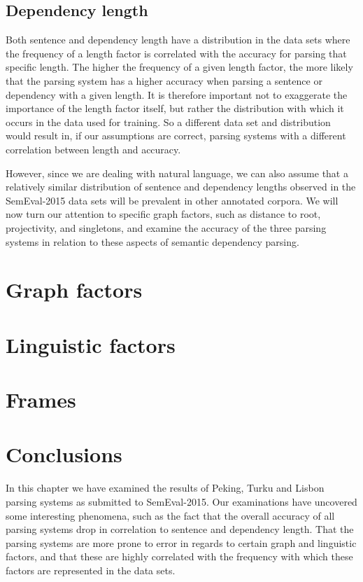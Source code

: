 \subsection{Dependency length}


Both sentence and dependency length have a distribution in the data sets where the frequency of a length factor is correlated with the accuracy for parsing that specific length. The higher the frequency of a given length factor, the more likely that the parsing system has a higher accuracy when parsing a sentence or dependency with a given length. It is therefore important not to exaggerate the importance of the length factor itself, but rather the distribution with which it occurs in the data used for training. So a different data set and distribution would result in, if our assumptions are correct, parsing systems with a different correlation between length and accuracy. 

However, since we are dealing with natural language, we can also assume that a relatively similar distribution of sentence and dependency lengths observed in the SemEval-2015 data sets will be prevalent in other annotated corpora. We will now turn our attention to specific graph factors, such as distance to root, projectivity, and singletons, and examine the accuracy of the three parsing systems in relation to these aspects of semantic dependency parsing.

\section{Graph factors}

\section{Linguistic factors}

\section{Frames}

\section{Conclusions}

In this chapter we have examined the results of Peking, Turku and Lisbon parsing systems as submitted to SemEval-2015. Our examinations have uncovered some interesting phenomena, such as the fact that the overall accuracy of all parsing systems drop in correlation to sentence and dependency length. That the parsing systems are more prone to error in regards to certain graph and linguistic factors, and that these are highly correlated with the frequency with which these factors are represented in the data sets.

